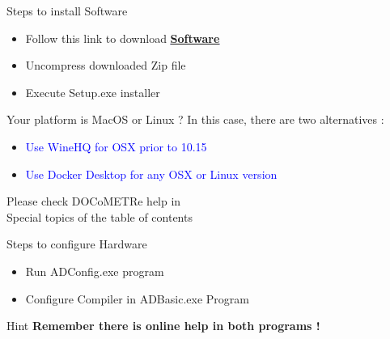 \documentclass[a4paper,11pt]{beamer}
\begin{document}
\begin{frame}[containsverbatim]
\begin{block}{Steps to install Software}
 \begin{itemize}
        \item Follow this link to download
 \textcolor{blue}{\textbf{\underline{\href{https://www.adwin.de/pub/cd/ADwin-CD.zip}{Software}}}}
        \item Uncompress downloaded Zip file
        \item Execute Setup.exe installer
    \end{itemize}
\end{block}

\begin{alertblock}{Your platform is MacOS or Linux ?}
    In this case, there are two alternatives :
    \begin{itemize}
        \item \textcolor{blue}{Use WineHQ for OSX prior to 10.15}
        \item \textcolor{blue}{Use Docker Desktop for any OSX or Linux version}
    \end{itemize}
    \centering
    Please check DOCoMETRe help in\\Special topics of the table of contents
\end{alertblock}
\end{frame}

\begin{frame}[containsverbatim]
\begin{block}{Steps to configure Hardware}
 \begin{itemize}
        \item Run ADConfig.exe program
        \item Configure Compiler in ADBasic.exe Program
    \end{itemize}
\end{block}

\begin{exampleblock}{Hint}
 \centering \textbf{Remember there is online help in both programs !}
\end{exampleblock}

\end{frame}
\end{document}
